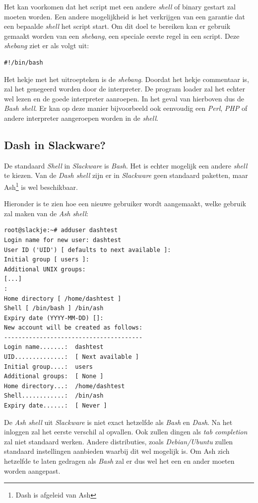 Het kan voorkomen dat het script met een andere \emph{shell} of binary gestart zal moeten worden. Een andere mogelijkheid is het verkrijgen van een garantie dat een bepaalde \emph{shell} het script start. Om dit doel te bereiken kan er gebruik gemaakt worden van een \emph{shebang}, een speciale eerste regel in een script. Deze \emph{shebang} ziet er als volgt uit:
\begin{lstlisting}
#!/bin/bash
\end{lstlisting}
Het hekje met het uitroepteken is de \emph{shebang}. Doordat het hekje commentaar is, zal het genegeerd worden door de interpreter. De program loader zal het echter wel lezen en de goede interpreter aanroepen. In het geval van hierboven dus de \emph{Bash shell}. Er kan op deze manier bijvoorbeeld ook eenvoudig een \emph{Perl}, \emph{PHP} of andere interpreter aangeroepen worden in de \emph{shell}. 

\subsection{Dash in Slackware?}
De standaard \emph{Shell} in \emph{Slackware} is \emph{Bash}. Het is echter mogelijk een andere \emph{shell} te kiezen. Van de \emph{Dash shell} zijn er in \emph{Slackware} geen standaard paketten, maar Ash\footnote{Dash is afgeleid van Ash} is wel beschikbaar. 

Hieronder is te zien hoe een nieuwe gebruiker wordt aangemaakt, welke gebruik zal maken van de \emph{Ash shell}:
\begin{lstlisting}
root@slackje:~# adduser dashtest
Login name for new user: dashtest
User ID ('UID') [ defaults to next available ]: 
Initial group [ users ]: 
Additional UNIX groups:
[...]
:  
Home directory [ /home/dashtest ] 
Shell [ /bin/bash ] /bin/ash
Expiry date (YYYY-MM-DD) []: 
New account will be created as follows:
---------------------------------------
Login name.......:  dashtest
UID..............:  [ Next available ]
Initial group....:  users
Additional groups:  [ None ]
Home directory...:  /home/dashtest
Shell............:  /bin/ash
Expiry date......:  [ Never ]
\end{lstlisting}
De \emph{Ash shell} uit \emph{Slackware} is niet exact hetzelfde als \emph{Bash} en \emph{Dash}. Na het inloggen zal het eerste verschil al opvallen. Ook zullen dingen als \emph{tab completion} zal niet standaard werken. Andere distributies, zoals \emph{Debian/Ubuntu} zullen standaard instellingen aanbieden waarbij dit wel mogelijk is. Om Ash zich hetzelfde te laten gedragen als \emph{Bash} zal er dus wel het een en ander moeten worden aangepast.

